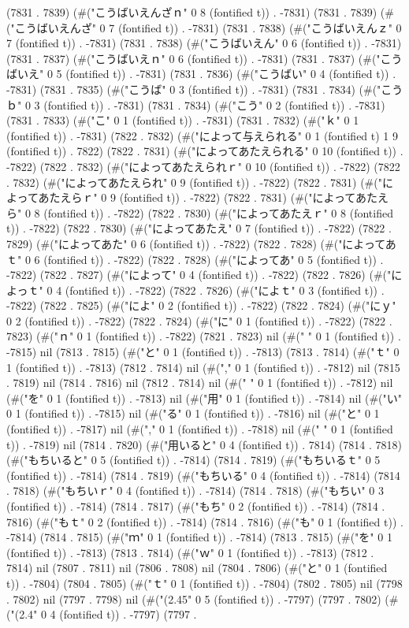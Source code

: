 (7831 . 7839) (#("こうばいえんざｎ" 0 8 (fontified t)) . -7831) (7831 . 7839) (#("こうばいえんざ" 0 7 (fontified t)) . -7831) (7831 . 7838) (#("こうばいえんｚ" 0 7 (fontified t)) . -7831) (7831 . 7838) (#("こうばいえん" 0 6 (fontified t)) . -7831) (7831 . 7837) (#("こうばいえｎ" 0 6 (fontified t)) . -7831) (7831 . 7837) (#("こうばいえ" 0 5 (fontified t)) . -7831) (7831 . 7836) (#("こうばい" 0 4 (fontified t)) . -7831) (7831 . 7835) (#("こうば" 0 3 (fontified t)) . -7831) (7831 . 7834) (#("こうｂ" 0 3 (fontified t)) . -7831) (7831 . 7834) (#("こう" 0 2 (fontified t)) . -7831) (7831 . 7833) (#("こ" 0 1 (fontified t)) . -7831) (7831 . 7832) (#("ｋ" 0 1 (fontified t)) . -7831) (7822 . 7832) (#("によって与えられる" 0 1 (fontified t) 1 9 (fontified t)) . 7822) (7822 . 7831) (#("によってあたえられる" 0 10 (fontified t)) . -7822) (7822 . 7832) (#("によってあたえられｒ" 0 10 (fontified t)) . -7822) (7822 . 7832) (#("によってあたえられ" 0 9 (fontified t)) . -7822) (7822 . 7831) (#("によってあたえらｒ" 0 9 (fontified t)) . -7822) (7822 . 7831) (#("によってあたえら" 0 8 (fontified t)) . -7822) (7822 . 7830) (#("によってあたえｒ" 0 8 (fontified t)) . -7822) (7822 . 7830) (#("によってあたえ" 0 7 (fontified t)) . -7822) (7822 . 7829) (#("によってあた" 0 6 (fontified t)) . -7822) (7822 . 7828) (#("によってあｔ" 0 6 (fontified t)) . -7822) (7822 . 7828) (#("によってあ" 0 5 (fontified t)) . -7822) (7822 . 7827) (#("によって" 0 4 (fontified t)) . -7822) (7822 . 7826) (#("によっｔ" 0 4 (fontified t)) . -7822) (7822 . 7826) (#("によｔ" 0 3 (fontified t)) . -7822) (7822 . 7825) (#("によ" 0 2 (fontified t)) . -7822) (7822 . 7824) (#("にｙ" 0 2 (fontified t)) . -7822) (7822 . 7824) (#("に" 0 1 (fontified t)) . -7822) (7822 . 7823) (#("ｎ" 0 1 (fontified t)) . -7822) (7821 . 7823) nil (#(" " 0 1 (fontified t)) . -7815) nil (7813 . 7815) (#("と" 0 1 (fontified t)) . -7813) (7813 . 7814) (#("ｔ" 0 1 (fontified t)) . -7813) (7812 . 7814) nil (#("," 0 1 (fontified t)) . -7812) nil (7815 . 7819) nil (7814 . 7816) nil (7812 . 7814) nil (#(" " 0 1 (fontified t)) . -7812) nil (#("を" 0 1 (fontified t)) . -7813) nil (#("用" 0 1 (fontified t)) . -7814) nil (#("い" 0 1 (fontified t)) . -7815) nil (#("る" 0 1 (fontified t)) . -7816) nil (#("と" 0 1 (fontified t)) . -7817) nil (#("," 0 1 (fontified t)) . -7818) nil (#(" " 0 1 (fontified t)) . -7819) nil (7814 . 7820) (#("用いると" 0 4 (fontified t)) . 7814) (7814 . 7818) (#("もちいると" 0 5 (fontified t)) . -7814) (7814 . 7819) (#("もちいるｔ" 0 5 (fontified t)) . -7814) (7814 . 7819) (#("もちいる" 0 4 (fontified t)) . -7814) (7814 . 7818) (#("もちいｒ" 0 4 (fontified t)) . -7814) (7814 . 7818) (#("もちい" 0 3 (fontified t)) . -7814) (7814 . 7817) (#("もち" 0 2 (fontified t)) . -7814) (7814 . 7816) (#("もｔ" 0 2 (fontified t)) . -7814) (7814 . 7816) (#("も" 0 1 (fontified t)) . -7814) (7814 . 7815) (#("ｍ" 0 1 (fontified t)) . -7814) (7813 . 7815) (#("を" 0 1 (fontified t)) . -7813) (7813 . 7814) (#("ｗ" 0 1 (fontified t)) . -7813) (7812 . 7814) nil (7807 . 7811) nil (7806 . 7808) nil (7804 . 7806) (#("と" 0 1 (fontified t)) . -7804) (7804 . 7805) (#("ｔ" 0 1 (fontified t)) . -7804) (7802 . 7805) nil (7798 . 7802) nil (7797 . 7798) nil (#("(2.45" 0 5 (fontified t)) . -7797) (7797 . 7802) (#("(2.4" 0 4 (fontified t)) . -7797) (7797 . 
